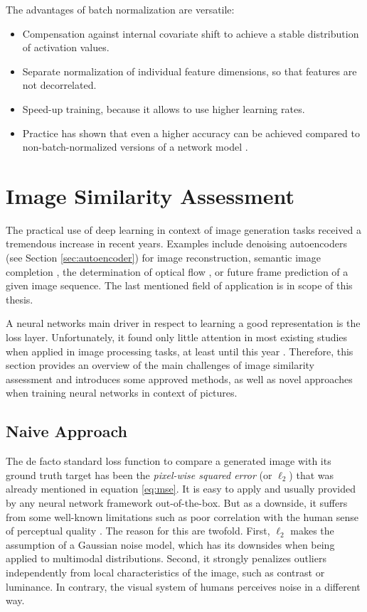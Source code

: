 The advantages of batch normalization are versatile:

\begin{itemize}
\item Compensation against internal covariate shift to achieve a stable distribution of activation values.
\item Separate normalization of individual feature dimensions, so that features are not decorrelated.
\item Speed-up training, because it allows to use higher learning rates.
\item Practice has shown that even a higher accuracy can be achieved compared to non-batch-normalized versions of a network model \parencite[p. 7]{batchnorm}.
\end{itemize}


\section{Image Similarity Assessment}

The practical use of deep learning in context of image generation tasks received a tremendous increase in recent years. Examples include denoising autoencoders (see Section \ref{sec:autoencoder}) for image reconstruction, semantic image completion \parencite{sem-img-inpainting}, the determination of optical flow \parencite{flownet}, \parencite{flow-static-img} or future  frame prediction of a given image sequence. The last mentioned field of application is in scope of this thesis. 

A neural networks main driver in respect to learning a good representation is the loss layer. Unfortunately, it found only little attention in most existing studies when applied in image processing tasks, at least until this year \parencite{loss-func-img-proc}. Therefore, this section provides an overview of the main challenges of image similarity assessment and introduces some approved methods, as well as novel approaches when training neural networks in context of pictures.


\subsection{Naive Approach}

The de facto standard loss function to compare a generated image with its ground truth target has been the \textit{pixel-wise squared error} (or $ \ell_{2} $) that was already mentioned in equation \ref{eq:mse}. It is easy to apply and usually provided by any neural network framework out-of-the-box. But as a downside, it suffers from some well-known limitations such as poor correlation with the human sense of perceptual quality \parencite{loss-func-img-proc}. The reason for this are twofold. First, $ \ell_{2} $ makes the assumption of a Gaussian noise model, which has its downsides when being applied to multimodal distributions. Second, it strongly penalizes outliers independently from local characteristics of the image, such as contrast or luminance. In contrary, the visual system of humans perceives noise in a different way.

